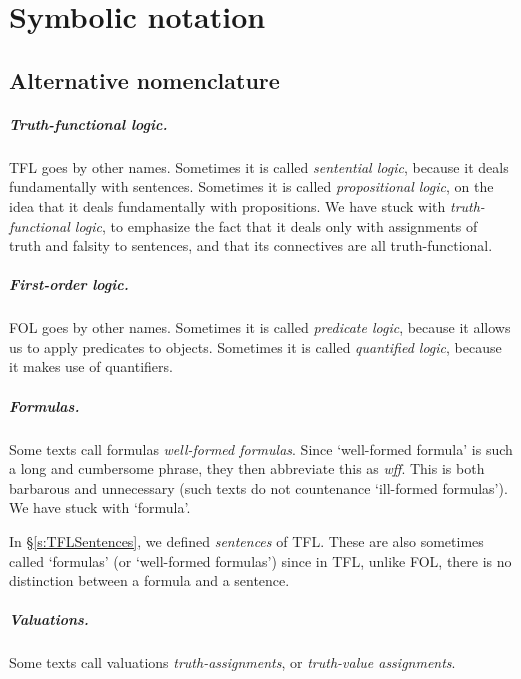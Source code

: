 
\chapter{Symbolic notation}
\label{app.notation}

\section{Alternative nomenclature}

\paragraph{Truth-functional logic.} TFL goes by other names. Sometimes it is called \emph{sentential logic}, because it deals fundamentally with sentences. Sometimes it is called \emph{propositional logic}, on the idea that it deals fundamentally with propositions. We have stuck with \emph{truth-functional logic}, to emphasize the fact that it deals only with assignments of truth and falsity to sentences, and that its connectives are all truth-functional.

\paragraph{First-order logic.} FOL goes by other names. Sometimes it is called \emph{predicate logic}, because it allows us to apply  predicates to objects. Sometimes it is called \emph{quantified logic}, because it makes use of quantifiers.

\paragraph{Formulas.} Some texts call formulas \emph{well-formed formulas}. Since `well-formed formula' is such a long and cumbersome phrase, they then abbreviate this as \emph{wff}. This is both barbarous and unnecessary (such texts do not countenance `ill-formed formulas'). We have stuck with `formula'. 

In \S\ref{s:TFLSentences}, we defined \emph{sentences} of TFL. These are also sometimes called `formulas' (or `well-formed formulas') since in TFL, unlike FOL, there is no distinction between a formula and a sentence.

\paragraph{Valuations.} Some texts call valuations \emph{truth-assignments}, or \emph{truth-value assignments}.

